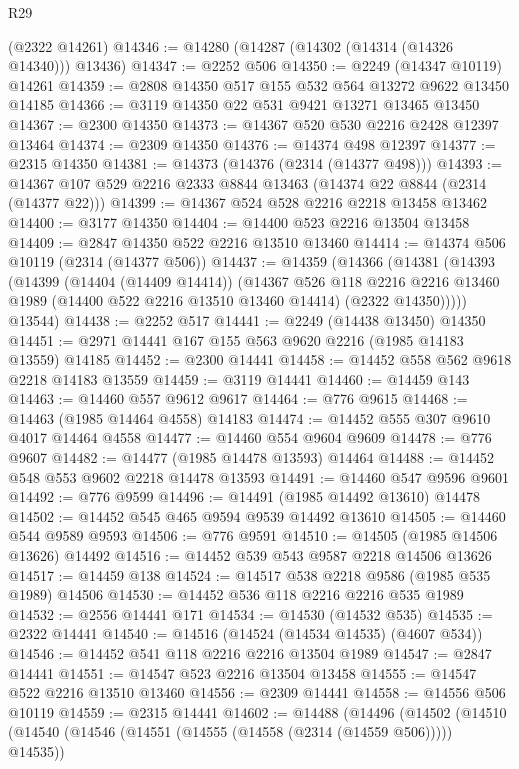 \begin{lexlean}{R29}
\begin{coremodule}
    (@2322 @14261)
@14346 := @14280 (@14287 (@14302 (@14314 (@14326 @14340))) @13436)
@14347 := @2252 @506
@14350 := @2249 (@14347 @10119) @14261
@14359 := @2808 @14350 @517 @155 @532 @564 @13272 @9622 @13450 @14185
@14366 := @3119 @14350 @22 @531 @9421 @13271 @13465 @13450
@14367 := @2300 @14350
@14373 := @14367 @520 @530 @2216 @2428 @12397 @13464
@14374 := @2309 @14350
@14376 := @14374 @498 @12397
@14377 := @2315 @14350
@14381 := @14373 (@14376 (@2314 (@14377 @498)))
@14393 := @14367 @107 @529 @2216 @2333 @8844 @13463 (@14374 @22 @8844 (@2314 (@14377 @22)))
@14399 := @14367 @524 @528 @2216 @2218 @13458 @13462
@14400 := @3177 @14350
@14404 := @14400 @523 @2216 @13504 @13458
@14409 := @2847 @14350 @522 @2216 @13510 @13460
@14414 := @14374 @506 @10119 (@2314 (@14377 @506))
@14437 := @14359
    (@14366
      (@14381
        (@14393
          (@14399
            (@14404 (@14409 @14414))
            (@14367
              @526
              @118
              @2216
              @2216
              @13460
              @1989
              (@14400 @522 @2216 @13510 @13460 @14414)
              (@2322 @14350)))))
      @13544)
@14438 := @2252 @517
@14441 := @2249 (@14438 @13450) @14350
@14451 := @2971 @14441 @167 @155 @563 @9620 @2216 (@1985 @14183 @13559) @14185
@14452 := @2300 @14441
@14458 := @14452 @558 @562 @9618 @2218 @14183 @13559
@14459 := @3119 @14441
@14460 := @14459 @143
@14463 := @14460 @557 @9612 @9617
@14464 := @776 @9615
@14468 := @14463 (@1985 @14464 @4558) @14183
@14474 := @14452 @555 @307 @9610 @4017 @14464 @4558
@14477 := @14460 @554 @9604 @9609
@14478 := @776 @9607
@14482 := @14477 (@1985 @14478 @13593) @14464
@14488 := @14452 @548 @553 @9602 @2218 @14478 @13593
@14491 := @14460 @547 @9596 @9601
@14492 := @776 @9599
@14496 := @14491 (@1985 @14492 @13610) @14478
@14502 := @14452 @545 @465 @9594 @9539 @14492 @13610
@14505 := @14460 @544 @9589 @9593
@14506 := @776 @9591
@14510 := @14505 (@1985 @14506 @13626) @14492
@14516 := @14452 @539 @543 @9587 @2218 @14506 @13626
@14517 := @14459 @138
@14524 := @14517 @538 @2218 @9586 (@1985 @535 @1989) @14506
@14530 := @14452 @536 @118 @2216 @2216 @535 @1989
@14532 := @2556 @14441 @171
@14534 := @14530 (@14532 @535)
@14535 := @2322 @14441
@14540 := @14516 (@14524 (@14534 @14535) (@4607 @534))
@14546 := @14452 @541 @118 @2216 @2216 @13504 @1989
@14547 := @2847 @14441
@14551 := @14547 @523 @2216 @13504 @13458
@14555 := @14547 @522 @2216 @13510 @13460
@14556 := @2309 @14441
@14558 := @14556 @506 @10119
@14559 := @2315 @14441
@14602 := @14488
    (@14496
      (@14502
        (@14510
          (@14540 (@14546 (@14551 (@14555 (@14558 (@2314 (@14559 @506))))) @14535))

\end{coremodule}
\end{lexlean}
